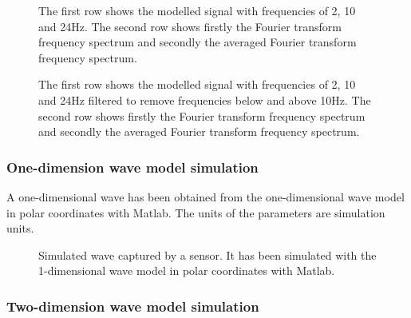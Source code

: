 \documentclass[12pt, a4paper]{article} %
\begin{document}
\begin{figure}[htbp]
	\centering
	
	\caption{The first row shows the modelled signal with frequencies of 2, 10 and 24Hz. The second row shows firstly the Fourier transform frequency spectrum and secondly the averaged Fourier transform frequency spectrum.}
	\label{fig:noisy_data_simulated}
\end{figure}


\begin{figure}[htbp]
	\centering
	
	\caption{The first row shows the modelled signal with frequencies of 2, 10 and 24Hz filtered to remove frequencies below and above 10Hz. The second row shows firstly the Fourier transform frequency spectrum and secondly the averaged Fourier transform frequency spectrum.}
	\label{fig:noisy_filtered_data_simulated}
\end{figure}

\setlength{\parskip}{0mm}

\newpage
\subsubsection{One-dimension wave model simulation}

\setlength{\parskip}{0mm}

A one-dimensional wave has been obtained from the one-dimensional wave model in polar coordinates with Matlab. The units of the parameters are simulation units.

\setlength{\parskip}{4mm}

\begin{figure}[htbp]
    \centering
    
    \caption{Simulated wave captured by a sensor. It has been simulated with the 1-dimensional wave model in polar coordinates with Matlab.}
    \label{fig:modelo1}
\end{figure}

\subsubsection{Two-dimension wave model simulation}
\end{document}
